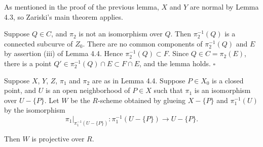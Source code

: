 \documentclass[12pt]{memoir}
\begin{document}
\begin{ptcbp}
As mentioned in the proof of the previous lemma, $X$ and $Y$ are normal by Lemma 4.3, so Zariski's main theorem applies.


Suppose $Q \in C$, and $\pi_2$ is not an isomorphism over $Q$. Then $\pi_2^{-1}(Q)$ is a connected subcurve of $Z_0$. There are no common components of $\pi_2^{-1}(Q)$ and $E$ by assertion (iii) of Lemma 4.4. Hence $\pi_2^{-1}(Q) \subset F$. Since $Q \in C = \pi_2(E)$, there is a point $Q' \in \pi_2^{-1}(Q) \cap E \subset F \cap E$, and the lemma holds. \hfill$\square$
\end{ptcbp}

\begin{Lem}\label{lem:4.6}
Suppose $X$, $Y$, $Z$, $\pi_1$ and $\pi_2$ are as in Lemma 4.4. Suppose $P \in X_0$ is a closed point, and $U$ is an open neighborhood of $P \in X$ such that $\pi_1$ is an isomorphism over $U - \{P\}$. Let $W$ be the $R$-scheme obtained by glueing $X - \{P\}$ and $\pi_1^{-1}(U)$ by the isomorphism
\[
\pi_1|_{\pi_1^{-1}(U - \{P\})}\colon \pi_1^{-1}(U - \{P\}) \to U - \{P\}.
\]

Then $W$ is projective over $R$.
\end{Lem}
\end{document}
